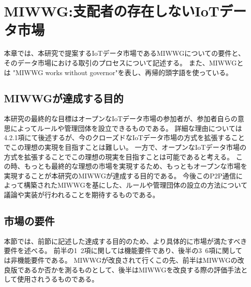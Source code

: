 \chapter{MIWWG:支配者の存在しないIoTデータ市場}
本章では、本研究で提案するIoTデータ市場であるMIWWGについての要件と、そのデータ市場における取引のプロセスについて記述する。
また、MIWWGとは "MIWWG works without governor"を表し、再帰的頭字語を使っている。

\section{MIWWGが達成する目的}
本研究の最終的な目標はオープンなIoTデータ市場の参加者が、参加者自らの意思によってルールや管理団体を設立できるものである。
詳細な理由については4.2.1項にて後述するが、今のクローズドなIoTデータ市場の方式を拡張することでこの理想の実現を目指すことは難しい。
一方で、オープンなIoTデータ市場の方式を拡張することでこの理想の現実を目指すことは可能であると考える。
この時、もっとも最終的な理想の市場を実現するため、もっともオープンな市場を実現することが本研究のMIWWGが達成する目的である。
今後このP2P通信によって構築されたMIWWGを基にした、ルールや管理団体の設立の方法について議論や実装が行われることを期待するものである。

\section{市場の要件}
本節では、前節に記述した達成する目的のため、より具体的に市場が満たすべき要件を述べる。
前半の1~2項に関しては機能要件であり、後半の3~6項に関しては非機能要件である。
MIWWGが改良されて行くこの先、前半はMIWWGの改良版であるか否かを測るものとして、後半はMIWWGを改良する際の評価手法として使用されうるものである。

